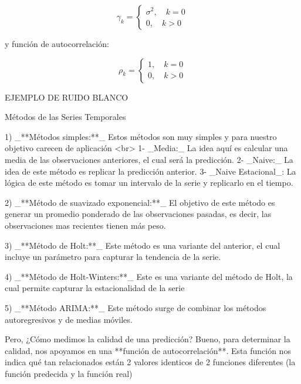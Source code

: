 \documentclass[a4paper,10pt]{article}
\begin{document}
\begin{equation*}
\gamma_k= \left\{ \begin{array}{lcc}
             \sigma^2, \quad k=0 \\
             0, \quad k > 0
             \end{array}
   \right.
\end{equation*}

y función de autocorrelación:

\begin{equation*}
\rho_k= \left\{ \begin{array}{lcc}
             1, \quad k=0 \\
             0, \quad k > 0
             \end{array}
   \right.
\end{equation*}

EJEMPLO DE RUIDO BLANCO




 Métodos de las Series Temporales

 1) \_**Métodos simples:**\_ Estos métodos son muy simples y para nuestro objetivo carecen de aplicación <br>
 1- \_Media:\_ La idea aquí es calcular una media de las observaciones anteriores, el cual será la predicción.
 2- \_Naive:\_ La idea de este método es replicar la predicción anterior.
 3- \_Naive Estacional\_: La lógica de este método es tomar un intervalo de la serie y replicarlo en el tiempo.

2) \_**Método de suavizado exponencial:**\_ El objetivo de este método es generar un promedio ponderado de las observaciones pasadas, es decir, las observaciones mas recientes tienen más peso.

3) \_**Método de Holt:**\_ Este método es una variante del anterior, el cual incluye un parámetro para capturar la tendencia de la serie.

4) \_**Método de Holt-Winters:**\_ Este es una variante del método de Holt, la cual permite capturar la estacionalidad de la serie

5) \_**Método ARIMA:**\_ Este método surge de combinar los métodos autoregresivos y de medias móviles.

Pero, ¿Cómo medimos la calidad de una predicción?
Bueno, para determinar la calidad, nos apoyamos en una **función de autocorrelación**. Esta función nos indica qué tan relacionados están 2 valores identicos de 2 funciones diferentes (la función predecida y la función real)
\end{document}
